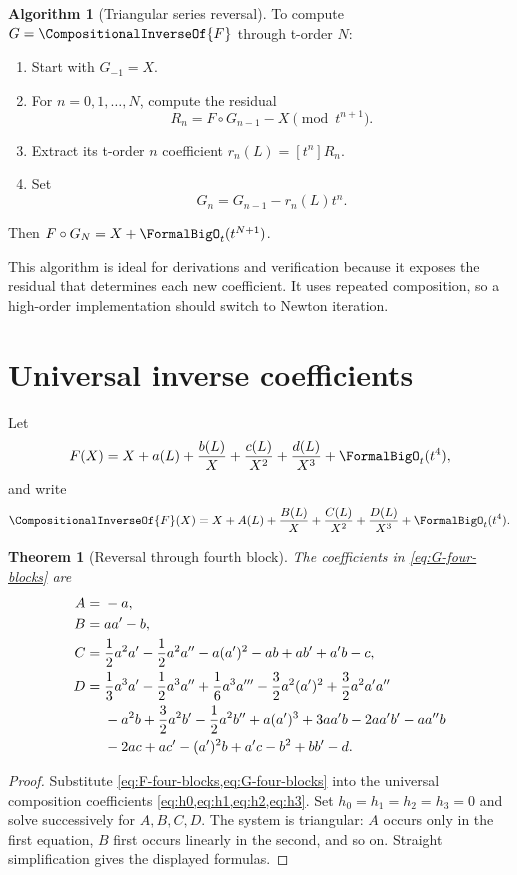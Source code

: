 \documentclass[11pt,openany]{book}
\theoremstyle{definition}
\newtheorem{algorithm}{Algorithm}[chapter]
\theoremstyle{plain}
\newtheorem{theorem}{Theorem}[chapter]
\theoremstyle{remark}
\newcommand{\rev}[1]{\CompositionalInverseOf{#1}}
\newcommand{\compose}{\mathbin{\circ}}
\begin{document}
\begin{algorithm}[Triangular series reversal]\label{alg:triangular-reversion}
To compute \(G=\rev{F}\) through t-order \(N\):
\begin{enumerate}
\item Start with \(G_{-1}=X\).
\item For \(n=0,1,\ldots,N\), compute the residual
\[
 R_n=F\compose G_{n-1}-X\pmod{t^{n+1}}.
\]
\item Extract its t-order \(n\) coefficient \(r_n(L)=[t^n]R_n\).
\item Set
\[
 G_n=G_{n-1}-r_n(L)t^n.
\]
\end{enumerate}
Then \(F\compose G_N=X+\FormalBigO_t(t^{N+1})\).
\end{algorithm}

This algorithm is ideal for derivations and verification because it exposes the
residual that determines each new coefficient.  It uses repeated composition,
so a high-order implementation should switch to Newton iteration.

\section{Universal inverse coefficients}
Let
\begin{equation}\label{eq:F-four-blocks}
 F(X)=X+a(L)+\frac{b(L)}X+\frac{c(L)}{X^2}
      +\frac{d(L)}{X^3}+\FormalBigO_t(t^4),
\end{equation}
and write
\begin{equation}\label{eq:G-four-blocks}
 \rev{F}(X)=X+A(L)+\frac{B(L)}X+\frac{C(L)}{X^2}
      +\frac{D(L)}{X^3}+\FormalBigO_t(t^4).
\end{equation}

\begin{theorem}[Reversal through fourth block]\label{thm:inverse-coefficients}
The coefficients in \cref{eq:G-four-blocks} are
\begin{align}
 A={}&-a,\label{eq:inverse-A}\\
 B={}&aa'-b,\label{eq:inverse-B}\\
 C={}&\frac12a^2a'-\frac12a^2a''-a(a')^2-ab+ab'+a'b-c,
 \label{eq:inverse-C}\\
 D={}&\frac13a^3a'-\frac12a^3a''+\frac16a^3a'''
 -\frac32a^2(a')^2+\frac32a^2a'a''\notag\\
 &{}-a^2b+\frac32a^2b'-\frac12a^2b''
 +a(a')^3+3aa'b-2aa'b'-aa''b\notag\\
 &{}-2ac+ac'-(a')^2b+a'c-b^2+bb'-d.
 \label{eq:inverse-D}
\end{align}
\end{theorem}
\begin{proof}
Substitute \cref{eq:F-four-blocks,eq:G-four-blocks} into the universal
composition coefficients \cref{eq:h0,eq:h1,eq:h2,eq:h3}.  Set
\(h_0=h_1=h_2=h_3=0\) and solve successively for \(A,B,C,D\).  The system is
triangular: \(A\) occurs only in the first equation, \(B\) first occurs linearly
in the second, and so on.  Straight simplification gives the displayed
formulas.
\end{proof}
\end{document}
